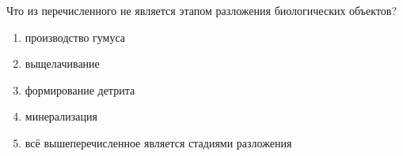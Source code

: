 
Что из перечисленного
не является этапом разложения биологических объектов?

\begin{enumerate}
    \item производство гумуса
    \item выщелачивание
    \item формирование детрита
    \item минерализация
    \item всё вышеперечисленное является стадиями разложения
\end{enumerate}



